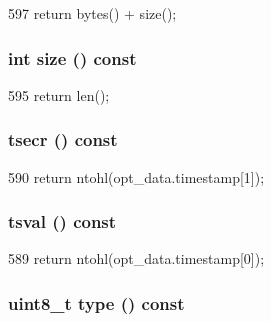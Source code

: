\begin{DoxyCode}
597 { return bytes() + size(); }
\end{DoxyCode}
\hypertarget{structNet_1_1TcpOpt_ab8e4e3e2a7bf18888b71bdf9dda0770b}{
\subsubsection[{size}]{\setlength{\rightskip}{0pt plus 5cm}int size () const}}
\label{structNet_1_1TcpOpt_ab8e4e3e2a7bf18888b71bdf9dda0770b}



\begin{DoxyCode}
595 { return len(); }
\end{DoxyCode}
\hypertarget{structNet_1_1TcpOpt_ab7cc35de244b5c22056e78886b23467c}{
\subsubsection[{tsecr}]{ tsecr () const}}
\label{structNet_1_1TcpOpt_ab7cc35de244b5c22056e78886b23467c}



\begin{DoxyCode}
590 { return ntohl(opt_data.timestamp[1]); }
\end{DoxyCode}
\hypertarget{structNet_1_1TcpOpt_aeba716f8ccf8e3bd796ce39ec3bf4959}{
\subsubsection[{tsval}]{ tsval () const}}
\label{structNet_1_1TcpOpt_aeba716f8ccf8e3bd796ce39ec3bf4959}



\begin{DoxyCode}
589 { return ntohl(opt_data.timestamp[0]); }
\end{DoxyCode}
\hypertarget{structNet_1_1TcpOpt_a7c3e8c8aa22970484617493a084000b9}{
\subsubsection[{type}]{\setlength{\rightskip}{0pt plus 5cm}uint8\_\-t type () const}}
\label{structNet_1_1TcpOpt_a7c3e8c8aa22970484617493a084000b9}



